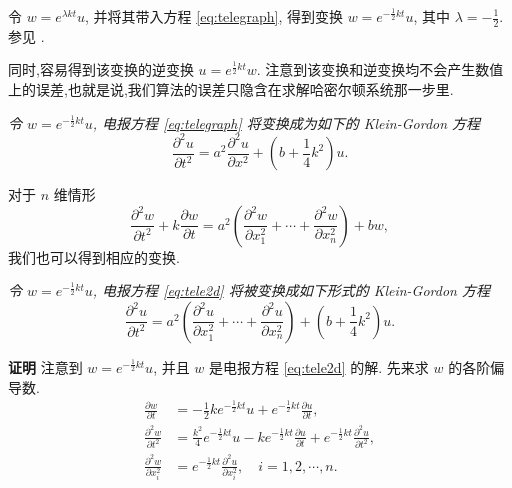 令 $w=e^{\lambda kt}u$, 并将其带入方程 \eqref{eq:telegraph}, 得到变换
$w=e^{-\frac{1}{2}kt}u$, 其中 $\lambda = -\frac{1}{2}$. 参见 \cite{polyanin2001handbook}.

同时,容易得到该变换的逆变换 $u=e^{\frac{1}{2}kt}w$. 注意到该变换和逆变换均不会产生数值上的误差,也就是说,我们算法的误差只隐含在求解哈密尔顿系统那一步里.

\begin{lemma}\label{thm:trans}
\emph{令 $w=e^{-\frac{1}{2}kt}u$, 电报方程 \eqref{eq:telegraph} 将变换成为如下的 Klein-Gordon 方程
\begin{equation}\label{eq:kg}
\frac{\partial ^2 u}{\partial t^2}=a^2 \frac{\partial ^2 u}{\partial x^2} + (b+\frac{1}{4}k^2) u.
\end{equation}}
\end{lemma}

对于 $n$ 维情形
\begin{equation}\label{eq:tele2d}
\frac{\partial ^2 w}{\partial t^2}+k\frac{\partial w}{\partial t}=a^2 (\frac{\partial ^2 w}{\partial x_1^2} +\cdots+
\frac{\partial ^2 w}{\partial x_n^2}) + b w,
\end{equation}
我们也可以得到相应的变换.

\begin{theorem}[$n$ 维情形]\label{thm:trans2}
\emph{令 $w=e^{-\frac{1}{2}kt}u$, 电报方程 \eqref{eq:tele2d} 将被变换成如下形式的 Klein-Gordon 方程
\begin{equation}\label{eq:kg2d}
\frac{\partial ^2 u}{\partial t^2}=a^2 (\frac{\partial ^2 u}{\partial x_1^2} +\cdots+ \frac{\partial ^2 u}{\partial x_n^2}) + (b+\frac{1}{4}k^2) u.
\end{equation}}
\end{theorem}

{\textbf{证明}} 注意到 $w=e^{-\frac{1}{2}kt}u$, 并且 $w$ 是电报方程 \eqref{eq:tele2d} 的解. 先来求 $w$ 的各阶偏导数.
\begin{align*}
\frac{\partial w}{\partial t} &= -\frac{1}{2}ke^{-\frac{1}{2}kt}u + e^{-\frac{1}{2}kt}\frac{\partial u}{\partial t},\\
\frac{\partial ^2 w}{\partial t^2} &=\frac{k^2}{4}e^{-\frac{1}{2}kt}u-ke^{-\frac{1}{2}kt}\frac{\partial u}{\partial t}
+e^{-\frac{1}{2}kt}\frac{\partial^2 u}{\partial t^2},\\
\frac{\partial ^2 w}{\partial x_i^2} &=e^{-\frac{1}{2}kt}\frac{\partial ^2 u}{\partial x_i^2},\quad i=1,2,\cdots,n.
\end{align*}

